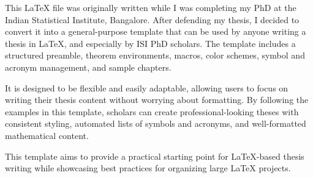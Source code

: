 %

This LaTeX file was originally written while I was completing my PhD at the Indian Statistical Institute, Bangalore. After defending my thesis, I decided to convert it into a general-purpose template that can be used by anyone writing a thesis in LaTeX, and especially by ISI PhD scholars. The template includes a structured preamble, theorem environments, macros, color schemes, symbol and acronym management, and sample chapters.  

It is designed to be flexible and easily adaptable, allowing users to focus on writing their thesis content without worrying about formatting. By following the examples in this template, scholars can create professional-looking theses with consistent styling, automated lists of symbols and acronyms, and well-formatted mathematical content.  

This template aims to provide a practical starting point for LaTeX-based thesis writing while showcasing best practices for organizing large LaTeX projects.
